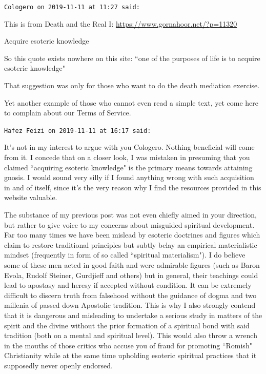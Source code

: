 \begin{footnotesize}
\begin{sffamily}
\hfill

\texttt{Cologero on 2019-11-11 at 11:27 said: }

This is from Death and the Real I: \url{https://www.gornahoor.net/?p=11320}

\begin{quotex}
Acquire esoteric knowledge

So this quote exists nowhere on this site: ``one of the purposes of life is to acquire esoteric knowledge"

That suggestion was only for those who want to do the death mediation exercise.

Yet another example of those who cannot even read a simple text, yet come here to complain about our Terms of Service.

\end{quotex}

\hfill

\texttt{Hafez Feizi on 2019-11-11 at 16:17 said: }

It's not in my interest to argue with you Cologero. Nothing beneficial will come from it. I concede that on a closer look, I was mistaken in presuming that you claimed ``acquiring esoteric knowledge" is the primary means towards attaining gnosis. I would sound very silly if I found anything wrong with such acquisition in and of itself, since it's the very reason why I find the resources provided in this website valuable. 

The substance of my previous post was not even chiefly aimed in your direction, but rather to give voice to my concerns about misguided spiritual development. Far too many times we have been mislead by esoteric doctrines and figures which claim to restore traditional principles but subtly belay an empirical materialistic mindset (frequently in form of so called ``spiritual materialism"). I do believe some of these men acted in good faith and were admirable figures (such as Baron Evola, Rudolf Steiner, Gurdjieff and others) but in general, their teachings could lead to apostasy and heresy if accepted without condition. It can be extremely difficult to discern truth from falsehood without the guidance of dogma and two millenia of passed down Apostolic tradition. This is why I also strongly contend that it is dangerous and misleading to undertake a serious study in matters of the spirit and the divine without the prior formation of a spiritual bond with said tradition (both on a mental and spiritual level). This would also throw a wrench in the mouths of those critics who accuse you of fraud for promoting ``Romish" Christianity while at the same time upholding esoteric spiritual practices that it supposedly never openly endorsed.



\end{sffamily}
\end{footnotesize}
